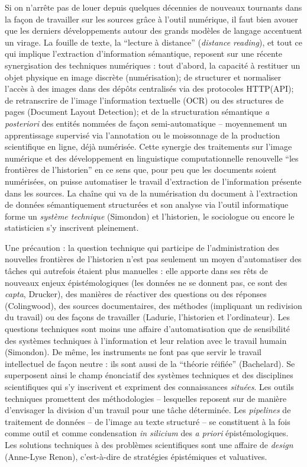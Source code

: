 Si on n'arrête pas de louer depuis quelques décennies de nouveaux tournants dans la façon de travailler sur les sources grâce à l'outil numérique, il faut bien avouer que les derniers développements autour des grands modèles de langage accentuent un virage. La fouille de texte, la \enquote{lecture à distance} (\textit{distance reading}), et tout ce qui implique l'extraction d'information sémantique, reposent sur une récente synergisation des techniques numériques : tout d'abord, la capacité à restituer un objet physique en image discrète (numérisation); de structurer et normaliser l'accès à des images dans des dépôts centralisés via des protocoles HTTP(API); de retranscrire de l'image l'information textuelle (OCR) ou des structures de pages (Document Layout Detection); et de la structuration sémantique \textit{a posteriori} des entités nommées de façon semi-automatique -- moyennement un apprentissage supervisé via l'annotation ou le moissonnage de la production scientifique en ligne, déjà numérisée. Cette synergie des traitements sur l'image numérique et des développement en linguistique computationnelle renouvelle \enquote{les frontières de l'historien} en ce sens que, pour peu que les documents soient numérisées, on puisse automatiser le travail d'extraction de l'information présente dans les sources. La chaîne qui va de la numérisation du document à l'extraction de données sémantiquement structurées et son analyse via l'outil informatique forme un \textit{système technique} (Simondon) et l'historien, le sociologue ou encore le statisticien s'y inscrivent pleinement. 

Une précaution : la question technique qui participe de l'administration des nouvelles frontières de l'historien n'est pas seulement un moyen d'automatiser des tâches qui autrefois étaient plus manuelles : elle apporte dans ses rêts de nouveaux enjeux épistémologiques (les données ne se donnent pas, ce sont des \textit{capta}, Drucker), des manières de réactiver des questions ou des réponses (Colingwood), des sources documentaires, des méthodes (impliquant un redivision du travail) ou des façons de travailler (Ladurie, l'historien et l'ordinateur). Les questions techniques sont moins une affaire d'automatisation que de sensibilité des systèmes techniques à l'information et leur relation avec le travail humain (Simondon). De même, les instruments ne font pas que servir le travail intellectuel de façon neutre : ils sont aussi de la \enquote{théorie réifiée} (Bachelard). Se superposent ainsi le champ énonciatif des systèmes techniques et des disciplines scientifiques qui s'y inscrivent et expriment des connaissances \textit{situées}. Les outils techniques promettent des méthodologies -- lesquelles reposent sur de manière d'envisager la division d'un travail pour une tâche déterminée. Les \textit{pipelines} de traitement de données -- de l'image au texte structuré -- se constituent à la fois comme outil et comme condensation \textit{in silicium} des \textit{a priori} épistémologiques. Les solutions techniques à des problèmes scientifiques sont une affaire de \textit{design} (Anne-Lyse Renon), c'est-à-dire de stratégies épistémiques et valuatives.


